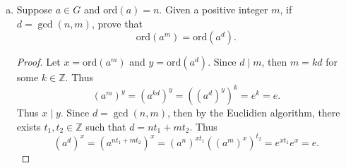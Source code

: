 \documentclass[12pt]{article}
\begin{document}
\begin{enumerate}
\begin{enumerate}[(a)]
\begin{proof}
                        \begin{equation*}
                            h=g^m=g^{tk}=(g^k)^t\in\langle g^k\rangle. 
                        \end{equation*}
                        If $k\nmid m$, then by the QR theorem, there exists
                        $q, r\in\mathbb{Z}$ such that $m=qk+r$ and $0\leq r<k$.
                        Hence 
                        \begin{equation*}
                            h=g^m=g^{qk+r}=g^{qk}g^r\Rightarrow g^{-qk}h=g^r.
                        \end{equation*}
                        We have that $g^{-qk}, h\in H$ but $g^r$ cannot be in
                        $H$ as that would contradict that $k$ is the smallest
                        nonzero integer such that $g^k\in H$. Thus $k\mid m$
                        and $H\subseteq\langle g^k\rangle$.\par\hspace{4mm} Let
                        $(g^k)^t\in\langle g^k\rangle$. Then since $g^k\in H$,
                        $(g^k)^t=(g^k)\cdots(g^k)\in H$ by closure. Hence
                        $H=\langle g^k\rangle$ and so $H$ is cyclic. 
                    \end{proof}
                \item Suppose $a\in G$ and ord$(a)=n$. Given a positive integer
                    $m$, if $d=\gcd(n, m)$, prove that 
                    \begin{equation*}
                        \text{ord}(a^m)=\text{ord}(a^d). 
                    \end{equation*}
                    \begin{proof}
                        Let $x=\text{ord}(a^m)$ and $y=\text{ord}(a^d)$. Since
                        $d\mid m$, then $m=kd$ for some $k\in\mathbb{Z}$. Thus 
                        \begin{equation*}
                            (a^m)^y=(a^{kd})^y=((a^d)^y)^k=e^k=e.
                        \end{equation*}
                        Thus $x\mid y$. Since $d=\gcd(n, m)$, then by the
                        Euclidien algorithm, there exists $t_1,
                        t_2\in\mathbb{Z}$ such that $d=nt_1+mt_2$. Thus
                        \begin{equation*}
                            (a^d)^x=(a^{nt_1+mt_2})^x=(a^n)^{xt_1}((a^m)^x)^{t_2}=e^{xt_1}e^x=e.
                        \end{equation*}

\end{proof}
\end{enumerate}
\end{enumerate}
\end{document}

